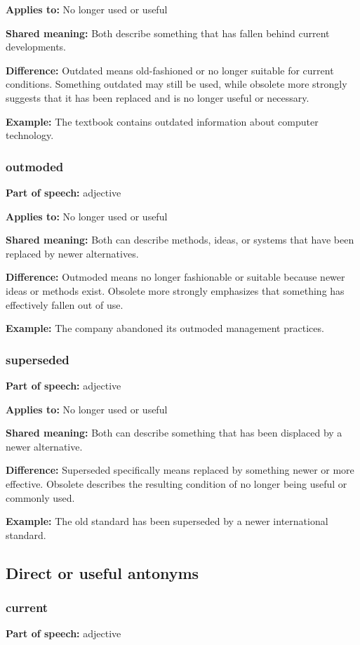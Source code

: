 \documentclass[11pt]{article}
\begin{document}
\textbf{Applies to:} No longer used or useful

\textbf{Shared meaning:} Both describe something that has fallen behind current developments.

\textbf{Difference:} Outdated means old-fashioned or no longer suitable for current conditions. Something outdated may still be used, while obsolete more strongly suggests that it has been replaced and is no longer useful or necessary.

\textbf{Example:} The textbook contains outdated information about computer technology.

\subsubsection{outmoded}
\textbf{Part of speech:} adjective

\textbf{Applies to:} No longer used or useful

\textbf{Shared meaning:} Both can describe methods, ideas, or systems that have been replaced by newer alternatives.

\textbf{Difference:} Outmoded means no longer fashionable or suitable because newer ideas or methods exist. Obsolete more strongly emphasizes that something has effectively fallen out of use.

\textbf{Example:} The company abandoned its outmoded management practices.

\subsubsection{superseded}
\textbf{Part of speech:} adjective

\textbf{Applies to:} No longer used or useful

\textbf{Shared meaning:} Both can describe something that has been displaced by a newer alternative.

\textbf{Difference:} Superseded specifically means replaced by something newer or more effective. Obsolete describes the resulting condition of no longer being useful or commonly used.

\textbf{Example:} The old standard has been superseded by a newer international standard.

\subsection{Direct or useful antonyms}
\subsubsection{current}
\textbf{Part of speech:} adjective
\end{document}
